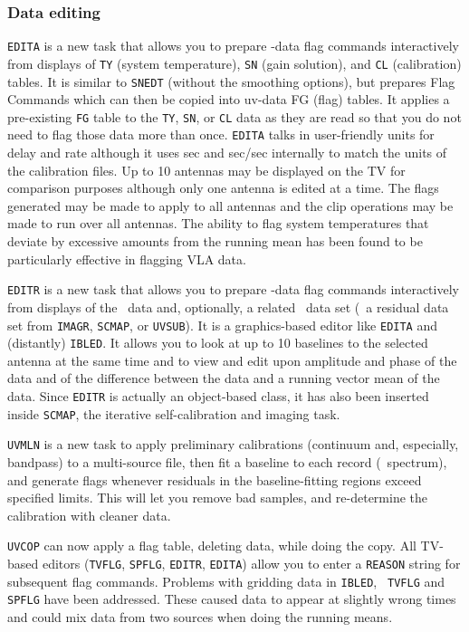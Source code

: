 \subsubsection{Data editing}

{\tt EDITA} is a new task that allows you to prepare \uv-data flag
commands interactively from displays of {\tt TY} (system temperature),
{\tt SN} (gain solution), and {\tt CL} (calibration) tables.  It is
similar to {\tt SNEDT} (without the smoothing options), but prepares
Flag Commands which can then be copied into uv-data FG (flag) tables.
It applies a pre-existing {\tt FG} table to the {\tt TY}, {\tt SN}, or
{\tt CL} data as they are read so that you do not need to flag those
data more than once.  {\tt EDITA} talks in user-friendly units for
delay and rate although it uses sec and sec/sec internally to match
the units of the calibration files.  Up to 10 antennas may be
displayed on the TV for comparison purposes although only one antenna
is edited at a time.  The flags generated may be made to apply to all
antennas and the clip operations may be made to run over all antennas.
The ability to flag system temperatures that deviate by excessive
amounts from the running mean has been found to be particularly
effective in flagging VLA data.

{\tt EDITR} is a new task that allows you to prepare \uv-data flag
commands interactively from displays of the \uv\ data and, optionally,
a related \uv\ data set (\eg\ a residual data set from {\tt IMAGR},
{\tt SCMAP}, or \hbox{{\tt UVSUB}}).  It is a graphics-based editor
like {\tt EDITA} and (distantly) \hbox{{\tt IBLED}}.  It allows you to
look at up to 10 baselines to the selected antenna at the same time
and to view and edit upon amplitude and phase of the data and of the
difference between the data and a running vector mean of the data.
Since {\tt EDITR} is actually an object-based class, it has also been
inserted inside {\tt SCMAP}, the iterative self-calibration and
imaging task.

{\tt UVMLN} is a new task to apply preliminary calibrations (continuum
and, especially, bandpass) to a multi-source file, then fit a baseline
to each record (\uv\ spectrum), and generate flags whenever residuals
in the baseline-fitting regions exceed specified limits.  This will
let you remove bad samples, and re-determine the calibration with
cleaner data.

{\tt UVCOP} can now apply a flag table, deleting data, while doing the
copy.  All TV-based editors ({\tt TVFLG}, {\tt SPFLG}, {\tt EDITR},
{\tt EDITA}) allow you to enter a {\tt REASON} string for subsequent
flag commands.  Problems with gridding data in {\tt IBLED}, {\tt
TVFLG} and {\tt SPFLG} have been addressed.  These caused data to
appear at slightly wrong times and could mix data from two sources
when doing the running means.

